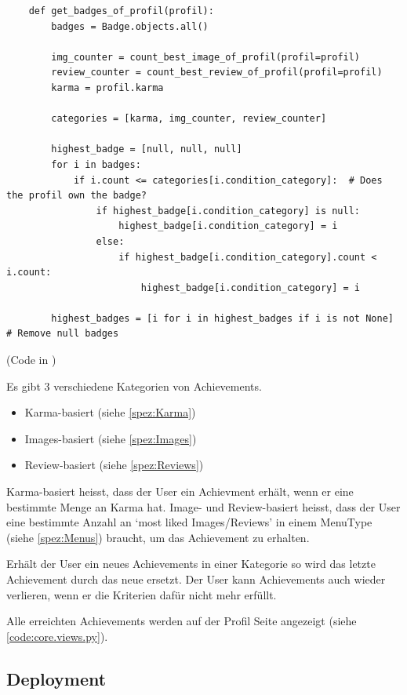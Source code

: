 \begin{lstlisting}
    def get_badges_of_profil(profil):
        badges = Badge.objects.all()
 
        img_counter = count_best_image_of_profil(profil=profil)
        review_counter = count_best_review_of_profil(profil=profil)
        karma = profil.karma

        categories = [karma, img_counter, review_counter]

        highest_badge = [null, null, null]
        for i in badges:
            if i.count <= categories[i.condition_category]:  # Does the profil own the badge?
                if highest_badge[i.condition_category] is null:
                    highest_badge[i.condition_category] = i
                else:
                    if highest_badge[i.condition_category].count < i.count:
                        highest_badge[i.condition_category] = i
        
        highest_badges = [i for i in highest_badges if i is not None]  # Remove null badges
\end{lstlisting}

(Code in )

Es gibt 3 verschiedene Kategorien von Achievements.
\begin{itemize}
    \item Karma-basiert (siehe \ref{spez:Karma})
    \item Images-basiert (siehe \ref{spez:Images})
    \item Review-basiert (siehe \ref{spez:Reviews})
\end{itemize}

Karma-basiert heisst, dass der User ein Achievment erhält, wenn er eine
bestimmte Menge an Karma hat. Image- und Review-basiert heisst, dass der User
eine bestimmte Anzahl an `most liked Images/Reviews' in einem MenuType (siehe
\ref{spez:Menus}) braucht, um das Achievement zu erhalten.

Erhält der User ein neues Achievements in einer Kategorie so wird das letzte
Achievement durch das neue ersetzt. Der User kann Achievements auch wieder
verlieren, wenn er die Kriterien dafür nicht mehr erfüllt.

Alle erreichten Achievements werden auf der Profil Seite angezeigt (siehe
\ref{code:core.views.py}).



\subsection{Deployment}\label{spez:Deployment}

